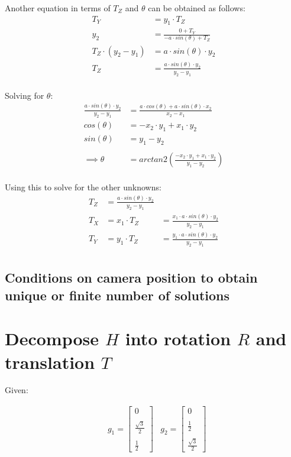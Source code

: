 \documentclass[12pt, oneside]{article}
\begin{document}
Another equation in terms of $T_Z$ and $\theta$ can be obtained as follows:
\begin{align*}
T_Y &= y_1 \cdot {T_Z}  \\
y_2 &= \frac{0 + T_Y}{-a \cdot sin(\theta) + T_Z} \\
T_Z \cdot (y_2 - y_1) &= a \cdot sin(\theta) \cdot y_2 \\
T_Z &= \frac{a \cdot sin(\theta) \cdot y_2}{y_2 - y_1} \\
\end{align*}

Solving for $\theta$:
\begin{align*}
\frac{a \cdot sin(\theta) \cdot y_2}{y_2 - y_1}
&= \frac{a \cdot cos(\theta) + a \cdot sin(\theta) \cdot x_2}{x_2 - x_1} \\
cos(\theta) &= -x_2 \cdot y_1 + x_1 \cdot y_2 \\
sin(\theta) &= y_1 - y_2  \\ \\
\implies \theta &= arctan2 \left( 
    \frac{-x_2 \cdot y_1 + x_1 \cdot y_2}{y_1 - y_2}
    \right) \\
\end{align*}

Using this to solve for the other unknowns:
\begin{align*}
    T_Z &= \frac{a \cdot sin(\theta) \cdot y_2}{y_2 - y_1} \\
    T_X &= x_1 \cdot {T_Z}  
        &= \frac{x_1 \cdot a \cdot sin(\theta) \cdot y_2}{y_2 - y_1} \\
    T_Y &= y_1 \cdot {T_Z}  
        &= \frac{y_1 \cdot a \cdot sin(\theta) \cdot y_2}{y_2 - y_1}\\
\end{align*}

\subsection{Conditions on camera position to obtain unique or finite number 
of solutions}

\clearpage
\section{Decompose $H$ into rotation $R$ and translation $T$}

Given:

\begin{align*}
    & g_1 =  
    \begin{bmatrix} 0 \\ \\ \frac{\sqrt{3}}{2} \\ \\ \frac{1}{2} \end{bmatrix} 
    & g_2 =  
    \begin{bmatrix} 0 \\ \\ \frac{1}{2} \\ \\ \frac{\sqrt{3}}{2} \end{bmatrix} 
\end{align*}
\end{document}
